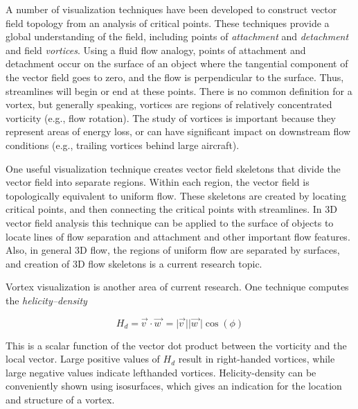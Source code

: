 A number of visualization techniques have been developed to construct vector field topology from an analysis of critical points. These techniques provide a global understanding of the field, including points of \emph{attachment} and \emph{detachment} and field \emph{vortices}. Using a fluid flow analogy, points of attachment and detachment occur on the surface of an object where the tangential component of the vector field goes to zero, and the flow is perpendicular to the surface. Thus, streamlines will begin or end at these points. There is no common definition for a vortex, but generally speaking, vortices are regions of relatively concentrated vorticity (e.g., flow rotation). The study of vortices is important because they represent areas of energy loss, or can have significant impact on downstream flow conditions (e.g., trailing vortices behind large aircraft).

One useful visualization technique creates vector field skeletons that divide the vector field into separate regions. Within each region, the vector field is topologically equivalent to uniform flow. These skeletons are created by locating critical points, and then connecting the critical points with streamlines. In 3D vector field analysis this technique can be applied to the surface of objects to locate lines of flow separation and attachment and other important flow features. Also, in general 3D flow, the regions of uniform flow are separated by surfaces, and creation of 3D flow skeletons is a current research topic.

Vortex visualization is another area of current research. One technique computes the \emph{helicity--density}

\begin{equation}\label{eq:9.12}
H_d = \overrightarrow{v\ } \cdot \overrightarrow{w\ } = \vert \overrightarrow{v\ } \vert \vert \overrightarrow{w\ } \vert \cos(\phi)
\end{equation}

This is a scalar function of the vector dot product between the vorticity and the local vector. Large positive values of $H_d$ result in right-handed vortices, while large negative values indicate lefthanded vortices. Helicity-density can be conveniently shown using isosurfaces, which gives an indication for the location and structure of a vortex.

